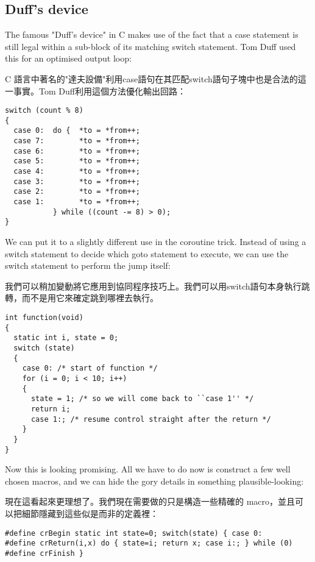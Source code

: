 \documentclass[12pt]{article}
\begin{document}
\begin{CJK}{UTF8}{bsmi}
\section{Duff's device}

The famous "Duff's device" in C makes use of the fact that a case statement is still legal within a sub-block of its matching switch statement. Tom Duff used this for an optimised output loop: 

C 語言中著名的"達夫設備"利用case語句在其匹配switch語句子塊中也是合法的這一事實。Tom Duff利用這個方法優化輸出回路： 

\begin{lstlisting}[basicstyle=\footnotesize, breaklines=true]
switch (count % 8) 
{
  case 0:  do {  *to = *from++;
  case 7:        *to = *from++;
  case 6:        *to = *from++;
  case 5:        *to = *from++;
  case 4:        *to = *from++;
  case 3:        *to = *from++;
  case 2:        *to = *from++;
  case 1:        *to = *from++;
           } while ((count -= 8) > 0);
}
\end{lstlisting}

We can put it to a slightly different use in the coroutine trick. Instead of using a switch statement to decide which goto statement to execute, we can use the switch statement to perform the jump itself:

我們可以稍加變動將它應用到協同程序技巧上。我們可以用switch語句本身執行跳轉，而不是用它來確定跳到哪裡去執行。 

\begin{lstlisting}[basicstyle=\footnotesize, breaklines=true]
int function(void) 
{
  static int i, state = 0;
  switch (state) 
  {
    case 0: /* start of function */
    for (i = 0; i < 10; i++) 
    {
      state = 1; /* so we will come back to ``case 1'' */
      return i;
      case 1:; /* resume control straight after the return */
    }
  }
}
\end{lstlisting}

Now this is looking promising. All we have to do now is construct a few well chosen macros, and we can hide the gory details in something plausible-looking:

現在這看起來更理想了。我們現在需要做的只是構造一些精確的 macro，並且可以把細節隱藏到這些似是而非的定義裡： 

\begin{lstlisting}[basicstyle=\footnotesize, breaklines=true]
#define crBegin static int state=0; switch(state) { case 0:
#define crReturn(i,x) do { state=i; return x; case i:; } while (0)
#define crFinish }


\end{lstlisting}
\end{CJK}
\end{document}
